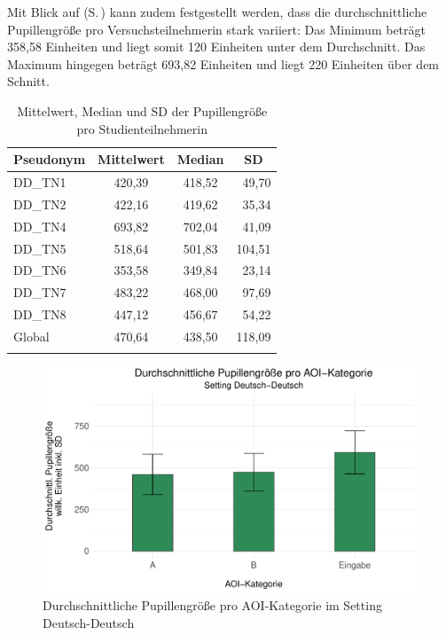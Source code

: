
\begin{sloppypar}
Mit Blick auf  (S.\,\pageref{K6:tab:DeDe:mean-sd-psize-TN}) kann zudem festgestellt werden, dass die durchschnittliche Pupillengröße pro Versuchsteilnehmer{\textperiodcentered}in stark variiert: Das Minimum beträgt 358,58 Einheiten und liegt somit 120 Einheiten unter dem Durchschnitt. Das Maximum hingegen beträgt 693,82 Einheiten und liegt 220 Einheiten über dem Schnitt.
\end{sloppypar}
 

\begin{table}
    \begin{tabular}{lccr}  
    \lsptoprule
    {Pseudonym} & \multicolumn{1}{c}{Mittelwert} & \multicolumn{1}{c}{Median} & \multicolumn{1}{c}{SD} \\\midrule
   DD\_TN1 &  420,39 & 418,52 & 49,70 \\ 
   DD\_TN2 &  422,16 &  419,62 & 35,34 \\ 
   DD\_TN4 &  693,82 & 702,04 & 41,09 \\ 
   DD\_TN5 &  518,64 &  501,83 & 104,51 \\ 
   DD\_TN6 &  353,58 &  349,84 & 23,14 \\ 
   DD\_TN7 &  483,22 &  468,00  & 97,69 \\ 
   DD\_TN8 &  447,12 &  456,67 & 54,22 \\ 
   \midrule
   Global &  470,64 & 438,50 & 118,09 \\ 
   \lspbottomrule
    \end{tabular}
    \caption[Mittelwert, Median und SD der Pupillengröße (TN)]{Mittelwert, Median und SD der Pupillengröße pro Studienteilnehmer{\textperiodcentered}in}
    \label{K6:tab:DeDe:mean-sd-psize-TN}
\end{table}



\begin{figure}
	\includegraphics[width=.85\textwidth]{Figures/EyeTracking/DD/ggplot_DD_meanPSize_de}
	\caption{Durchschnittliche Pupillengröße pro AOI-Kategorie im Setting Deutsch-Deutsch}
	\label{K6:fig:DD:mean-error-psize}
\end{figure}

